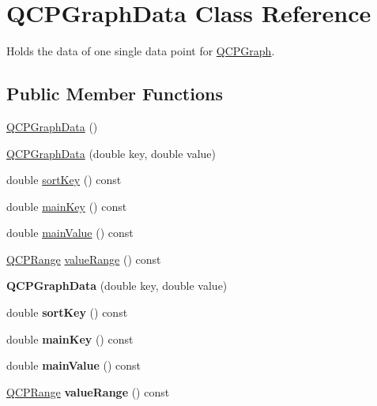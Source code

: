 \hypertarget{class_q_c_p_graph_data}{}\section{Q\+C\+P\+Graph\+Data Class Reference}
\label{class_q_c_p_graph_data}


Holds the data of one single data point for \hyperlink{class_q_c_p_graph}{Q\+C\+P\+Graph}.  


\subsection*{Public Member Functions}
\begin{DoxyCompactItemize}
\item 
\hyperlink{class_q_c_p_graph_data_ac43f7499383d2fa2ffb7a4ad43f76c7c}{Q\+C\+P\+Graph\+Data} ()
\item 
\hyperlink{class_q_c_p_graph_data_a2c32177f12f902f4e05f712837082bd6}{Q\+C\+P\+Graph\+Data} (double key, double value)
\item 
double \hyperlink{class_q_c_p_graph_data_aae097cdf07f2c31edbbc7931e1e2e47f}{sort\+Key} () const 
\item 
double \hyperlink{class_q_c_p_graph_data_a4466437f7f8ddc63f9239fba54f5629a}{main\+Key} () const 
\item 
double \hyperlink{class_q_c_p_graph_data_ad43edfdb885b27e78ec786cc191d4b19}{main\+Value} () const 
\item 
\hyperlink{class_q_c_p_range}{Q\+C\+P\+Range} \hyperlink{class_q_c_p_graph_data_a5eb7d51a8cdccbc38b4f745ca0bdfed9}{value\+Range} () const 
\item 
{\bfseries Q\+C\+P\+Graph\+Data} (double key, double value)\hypertarget{class_q_c_p_graph_data_a2c32177f12f902f4e05f712837082bd6}{}\label{class_q_c_p_graph_data_a2c32177f12f902f4e05f712837082bd6}

\item 
double {\bfseries sort\+Key} () const \hypertarget{class_q_c_p_graph_data_aae097cdf07f2c31edbbc7931e1e2e47f}{}\label{class_q_c_p_graph_data_aae097cdf07f2c31edbbc7931e1e2e47f}

\item 
double {\bfseries main\+Key} () const \hypertarget{class_q_c_p_graph_data_a4466437f7f8ddc63f9239fba54f5629a}{}\label{class_q_c_p_graph_data_a4466437f7f8ddc63f9239fba54f5629a}

\item 
double {\bfseries main\+Value} () const \hypertarget{class_q_c_p_graph_data_ad43edfdb885b27e78ec786cc191d4b19}{}\label{class_q_c_p_graph_data_ad43edfdb885b27e78ec786cc191d4b19}

\item 
\hyperlink{class_q_c_p_range}{Q\+C\+P\+Range} {\bfseries value\+Range} () const \hypertarget{class_q_c_p_graph_data_a5eb7d51a8cdccbc38b4f745ca0bdfed9}{}\label{class_q_c_p_graph_data_a5eb7d51a8cdccbc38b4f745ca0bdfed9}

\end{DoxyCompactItemize}

